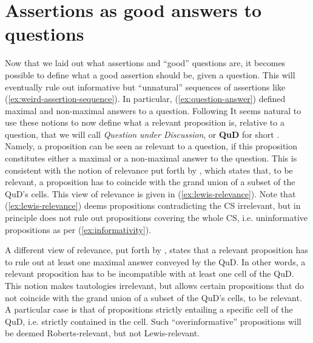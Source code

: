 \begin{exe}
	\label{ex:trivial-question}
\end{exe}

\section{Assertions as good answers to questions}

Now that we laid out what assertions and ``good'' questions are, it becomes possible to define what a good assertion should be, given a question. This will eventually rule out informative but ``unnatural'' sequences of assertions like (\ref{ex:weird-assertion-sequence}). In particular, (\ref{ex:question-answer}) defined maximal and non-maximal answers to a question. Following  It seems natural to use these notions to now define what a relevant proposition is, relative to a question, that we will call \textit{Question under Discussion}, or \textbf{QuD} for short \citep{VanKuppevelt1995a,VanKuppevelt1995b,Roberts1996,Roberts2012,Ginzburg1996,Buring2003}. Namely, a proposition can be seen as relevant to a question, if this proposition constitutes either a maximal or a non-maximal answer to the question. This is consistent with the notion of relevance put forth by \cite{Lewis1988}, which states that, to be relevant, a proposition has to coincide with the grand union of a subset of the QuD's cells. This view of relevance is given in (\ref{ex:lewis-relevance}).  Note that (\ref{ex:lewis-relevance}) deems propositions contradicting the CS irrelevant, but in principle does not rule out propositions covering the whole CS, i.e. uninformative propositions as per (\ref{ex:informativity}).

\begin{exe}
	\label{ex:lewis-relevance}
\end{exe}

A different view of relevance, put forth by \cite{Roberts2012}, states that a relevant proposition has to rule out at least one maximal answer conveyed by the QuD. In other words, a relevant proposition has to be incompatible with at least one cell of the QuD. This notion makes tautologies irrelevant, but allows certain propositions that do not coincide with the grand union of a subset of the QuD's cells, to be relevant. A particular case is that of propositions strictly entailing a specific cell of the QuD, i.e. strictly contained in the cell. Such ``overinformative'' propositions will be deemed Roberts-relevant, but not Lewis-relevant.

